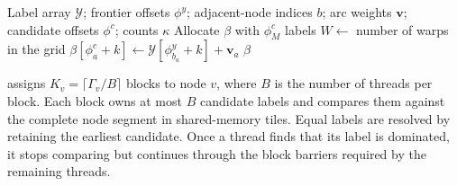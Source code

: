 \documentclass[letterpaper]{article}
\begin{document}
\begin{algorithm}[htbp!]
\caption{Materialize GPU Layer Candidates}
\label{alg:expand_candidates}
\begin{algorithmic}[1]
\Require Label array $\mathcal{Y}$; frontier offsets $\phi^y$; adjacent-node indices $b$; arc weights $\mathbf{v}$; candidate offsets $\phi^c$; counts $\kappa$
    \State Allocate $\beta$ with $\phi^c_M$ labels
    \State $W\gets$ number of warps in the grid
                \State $\beta[\phi^c_a+k]\gets
                \mathcal{Y}[\phi^y_{b_a}+k]+\mathbf{v}_a$
            \EndFor
        \EndFor
    \EndFor
    \State \Return $\beta$
\EndProcedure
\end{algorithmic}
\end{algorithm}

 assigns $K_v=\lceil\Gamma_v/B\rceil$ blocks to node $v$, where $B$ is the number of threads per block. Each block owns at most $B$ candidate labels and compares them against the complete node segment in shared-memory tiles. Equal labels are resolved by retaining the earliest candidate. Once a thread finds that its label is dominated, it stops comparing but continues through the block barriers required by the remaining threads.
\end{document}
